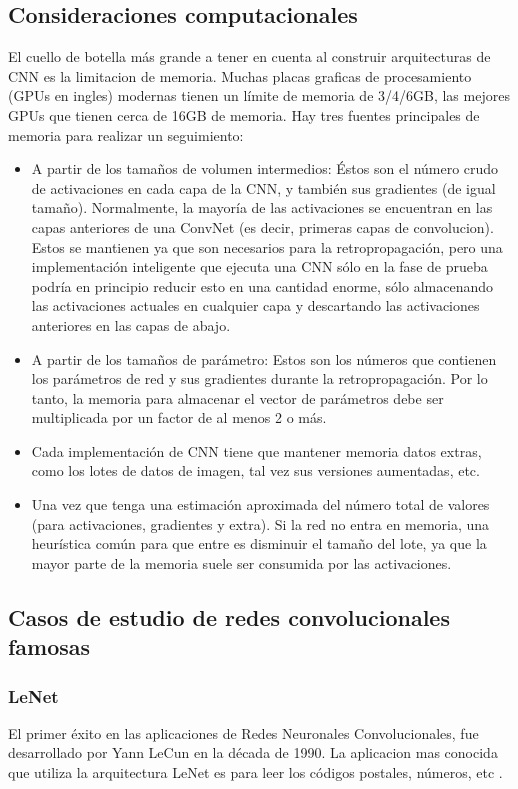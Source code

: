 \documentclass[a4paper,11pt,spanish]{book}
\begin{document}
    \subsection {Consideraciones computacionales}
      El cuello de botella más grande a tener en cuenta al construir arquitecturas de CNN es la limitacion de memoria.
      Muchas placas graficas de procesamiento (GPUs en ingles) modernas tienen un límite de memoria de 3/4/6GB, las mejores GPUs que tienen cerca de 16GB de memoria.
      Hay tres fuentes principales de memoria para realizar un seguimiento:
      \begin{itemize}
	\item A partir de los tamaños de volumen intermedios: Éstos son el número crudo de activaciones en cada capa de la CNN, y también sus gradientes (de igual tamaño).
	  Normalmente, la mayoría de las activaciones se encuentran en las capas anteriores de una ConvNet (es decir, primeras capas de convolucion).
	  Estos se mantienen ya que son necesarios para la retropropagación, pero una implementación inteligente que ejecuta una CNN sólo en la fase de prueba podría
	  en principio reducir esto en una cantidad enorme, sólo almacenando las activaciones actuales en cualquier capa y descartando las activaciones anteriores
	  en las capas de abajo.
	\item A partir de los tamaños de parámetro: Estos son los números que contienen los parámetros de red y sus gradientes durante la retropropagación.
	  Por lo tanto, la memoria para almacenar el vector de parámetros debe ser multiplicada por un factor de al menos 2 o más.
	\item Cada implementación de CNN tiene que mantener memoria datos extras, como los lotes de datos de imagen, tal vez sus versiones aumentadas, etc.
	\item Una vez que tenga una estimación aproximada del número total de valores (para activaciones, gradientes y extra). Si la red no entra en memoria, una heurística común
	  para que entre es disminuir el tamaño del lote, ya que la mayor parte de la memoria suele ser consumida por las activaciones.
      \end{itemize}


    \subsection {Casos de estudio de redes convolucionales famosas}

      \subsubsection{LeNet}
	 El primer éxito en las aplicaciones de Redes Neuronales Convolucionales, fue desarrollado por Yann LeCun en la década de 1990. La aplicacion mas conocida que utiliza la arquitectura
	 LeNet es para leer los códigos postales, números, etc \cite{Lecun:LeNet}.
\end{document}

